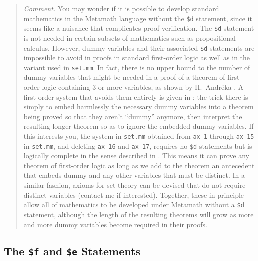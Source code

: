 {\footnotesize\begin{quotation}\label{nodd}
{\em Comment.} You may wonder if it is possible to develop standard
mathematics in the Metamath language without the \texttt{\$d} statement, since it seems like a nuisance that complicates proof
verification. The \texttt{\$d} statement is not needed in certain subsets of
mathematics such as propositional calculus.  However, dummy
variables and their associated \texttt{\$d}
statements are impossible to avoid in proofs in standard first-order logic as
well as in the variant used in \texttt{set.mm}.  In fact, there is no upper bound to
the number of dummy variables that might be needed in a proof of a theorem of
first-order logic containing 3 or more variables, as shown by H.\
Andr\'{e}ka \cite{Nemeti}.  A first-order system that
avoids them entirely is given in \cite{Megill}\index{Megill, Norman}; the
trick there is simply to embed harmlessly the necessary dummy variables into a
theorem being proved so that they aren't ``dummy'' anymore, then interpret the
resulting longer theorem so as to ignore the embedded dummy variables.  If
this interests you, the system in \texttt{set.mm} obtained from \texttt{ax-1}
through \texttt{ax-15} in \texttt{set.mm}, and deleting \texttt{ax-16} and \texttt{ax-17},
requires no \texttt{\$d} statements but is logically complete in the sense
described in \cite{Megill}.  This means it can prove any theorem of
first-order logic as long as we add to the theorem an antecedent that embeds
dummy and any other variables that must be distinct.  In a similar fashion,
axioms for set theory can be devised that do not require distinct variables
(contact me if interested).  Together, these in principle allow all of
mathematics to be developed under Metamath without a \texttt{\$d} statement,
although the length of the resulting theorems will grow as more and
more dummy variables become required in their proofs.
\end{quotation}}

\subsection{The \texttt{\$f}
and \texttt{\$e} Statements}\label{dollaref}

